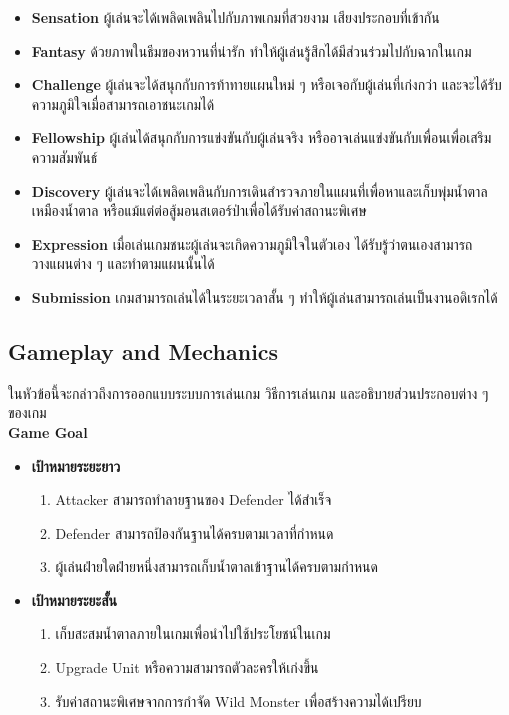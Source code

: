 \documentclass[12pt,oneside,openright,a4paper]{cpe-thai-project}
\begin{document}
\begin{enumerate}
\begin{itemize}
    \begin{itemize}
      \item \textbf{Sensation}  ผู้เล่นจะได้เพลิดเพลินไปกับภาพเกมที่สวยงาม เสียงประกอบที่เข้ากัน 
      \item \textbf{Fantasy}  ด้วยภาพในธีมของหวานที่น่ารัก ทำให้ผู้เล่นรู้สึกได้มีส่วนร่วมไปกับฉากในเกม
      \item \textbf{Challenge}  ผู้เล่นจะได้สนุกกับการท้าทายแผนใหม่ ๆ หรือเจอกับผู้เล่นที่เก่งกว่า และจะได้รับความภูมิใจเมื่อสามารถเอาชนะเกมได้
      \item \textbf{Fellowship}  ผู้เล่นได้สนุกกับการแข่งขันกับผู้เล่นจริง หรืออาจเล่นแข่งขันกับเพื่อนเพื่อเสริมความสัมพันธ์
      \item \textbf{Discovery}  ผู้เล่นจะได้เพลิดเพลินกับการเดินสำรวจภายในแผนที่เพื่อหาและเก็บพุ่มน้ำตาล เหมืองน้ำตาล หรือแม้แต่ต่อสู้มอนสเตอร์ป่าเพื่อได้รับค่าสถานะพิเศษ
      \item \textbf{Expression}  เมื่อเล่นเกมชนะผู้เล่นจะเกิดความภูมิใจในตัวเอง ได้รับรู้ว่าตนเองสามารถวางแผนต่าง ๆ และทำตามแผนนั้นได้
      \item \textbf{Submission}  เกมสามารถเล่นได้ในระยะเวลาสั้น ๆ ทำให้ผู้เล่นสามารถเล่นเป็นงานอดิเรกได้	
    \end{itemize}
  \end{itemize}
\end{enumerate}

\pagebreak
\subsection{Gameplay and Mechanics}
ในหัวข้อนี้จะกล่าวถึงการออกแบบระบบการเล่นเกม วิธีการเล่นเกม และอธิบายส่วนประกอบต่าง ๆ ของเกม\\

\textbf{Game Goal}
\begin{itemize}
  \item{\textbf{เป้าหมายระยะยาว}}
  \begin{enumerate}
    \item Attacker สามารถทำลายฐานของ Defender ได้สำเร็จ
    \item Defender สามารถป้องกันฐานได้ครบตามเวลาที่กำหนด
    \item ผู้เล่นฝ่ายใดฝ่ายหนึ่งสามารถเก็บน้ำตาลเข้าฐานได้ครบตามกำหนด
  \end{enumerate}
  
  \item{\textbf{เป้าหมายระยะสั้น}}
  \begin{enumerate}
    \item เก็บสะสมน้ำตาลภายในเกมเพื่อนำไปใช้ประโยชน์ในเกม
    \item Upgrade Unit หรือความสามารถตัวละครให้เก่งขึ้น
    \item รับค่าสถานะพิเศษจากการกำจัด Wild Monster เพื่อสร้างความได้เปรียบ
  \end{enumerate}
\end{itemize}
\end{document}
